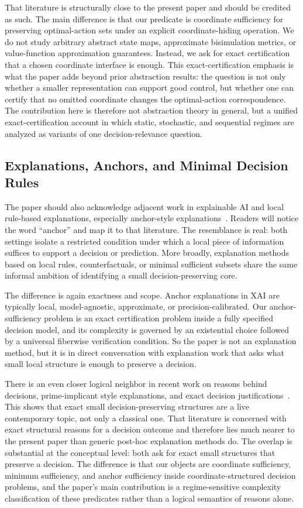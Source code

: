 That literature is structurally close to the present paper and should be credited as such. The main difference is that our predicate is coordinate sufficiency for preserving optimal-action sets under an explicit coordinate-hiding operation. We do not study arbitrary abstract state maps, approximate bisimulation metrics, or value-function approximation guarantees. Instead, we ask for exact certification that a chosen coordinate interface is enough. This exact-certification emphasis is what the paper adds beyond prior abstraction results: the question is not only whether a smaller representation can support good control, but whether one can certify that no omitted coordinate changes the optimal-action correspondence. The contribution here is therefore not abstraction theory in general, but a unified exact-certification account in which static, stochastic, and sequential regimes are analyzed as variants of one decision-relevance question.

\subsection{Explanations, Anchors, and Minimal Decision Rules}

The paper should also acknowledge adjacent work in explainable AI and local rule-based explanations, especially anchor-style explanations~\cite{ribeiro2018anchors}. Readers will notice the word ``anchor'' and map it to that literature. The resemblance is real: both settings isolate a restricted condition under which a local piece of information suffices to support a decision or prediction. More broadly, explanation methods based on local rules, counterfactuals, or minimal sufficient subsets share the same informal ambition of identifying a small decision-preserving core.

The difference is again exactness and scope. Anchor explanations in XAI are typically local, model-agnostic, approximate, or precision-calibrated. Our anchor-sufficiency problem is an exact certification problem inside a fully specified decision model, and its complexity is governed by an existential choice followed by a universal fiberwise verification condition. So the paper is not an explanation method, but it is in direct conversation with explanation work that asks what small local structure is enough to preserve a decision.

There is an even closer logical neighbor in recent work on reasons behind decisions, prime-implicant style explanations, and exact decision justifications~\cite{darwiche2023reasons}. This shows that exact small decision-preserving structures are a live contemporary topic, not only a classical one. That literature is concerned with exact structural reasons for a decision outcome and therefore lies much nearer to the present paper than generic post-hoc explanation methods do. The overlap is substantial at the conceptual level: both ask for exact small structures that preserve a decision. The difference is that our objects are coordinate sufficiency, minimum sufficiency, and anchor sufficiency inside coordinate-structured decision problems, and the paper's main contribution is a regime-sensitive complexity classification of these predicates rather than a logical semantics of reasons alone.

